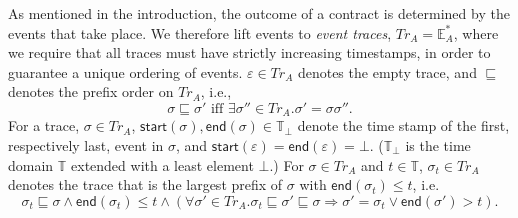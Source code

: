 \documentclass[orivec,final]{llncs-href}
\newcommand{\timeset}{\mathbb{T}}
\newcommand{\eventset}[1]{\mathbb{E}_{#1}}
\newcommand{\traceset}[1]{\mathit{Tr}_{#1}}
\newcommand{\tracestart}{\mathsf{start}}
\newcommand{\traceend}{\mathsf{end}}
\newcommand{\trace}{\sigma}
\newcommand{\emptytrace}{\varepsilon}
\begin{document}
As mentioned in the introduction, the outcome of a contract is
determined by the events that take place. We therefore lift events to
\emph{event traces}, $\traceset{A} = \eventset{A}^{*}$, where we
require that all traces must have strictly increasing timestamps, in
order to guarantee a unique ordering of events. $\emptytrace \in \traceset{A}$ denotes the empty trace,
and $\sqsubseteq$ denotes the prefix order on $\traceset{A}$,
i.e.,
\[
\trace \sqsubseteq \trace' \mbox{ iff } \exists \trace'' \in
\traceset{A}. \trace ' = \trace \trace'' .
\]
For a trace, $\trace \in \traceset{A}$, $\tracestart(\trace),
\traceend(\trace) \in \timeset_\bot$ denote the time stamp of the
first, respectively last, event in $\trace$, and 
$\tracestart(\emptytrace) = \traceend(\emptytrace) =
\bot$. ($\timeset_\bot$ is the time domain $\timeset$ extended with a
least element $\bot$.) For $\trace \in \traceset{A}$ and $t \in
\timeset$, $\trace_t \in \traceset{A}$ denotes the trace that is the
largest prefix of $\trace$ with $\traceend(\trace_t) \leq t$, i.e.
\[
\trace_t \sqsubseteq \trace \land \traceend(\trace_t) \leq
t \land \left(\forall \trace' \in \traceset{A}. \trace_t \sqsubseteq \trace'
\sqsubseteq \trace \Rightarrow \trace' = \trace_t \lor
\traceend(\trace') > t \right).
\]
\end{document}

